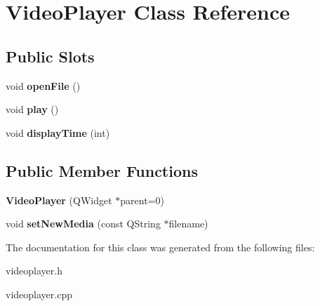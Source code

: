 \hypertarget{class_video_player}{\section{\-Video\-Player \-Class \-Reference}
\label{class_video_player}
}
\subsection*{\-Public \-Slots}
\begin{DoxyCompactItemize}
\item 
\hypertarget{class_video_player_a96b3bad4d8680ba4b41b05aeabcd26b1}{void {\bfseries open\-File} ()}\label{class_video_player_a96b3bad4d8680ba4b41b05aeabcd26b1}

\item 
\hypertarget{class_video_player_a13ba0d270e849566f33ceffd7fb425c0}{void {\bfseries play} ()}\label{class_video_player_a13ba0d270e849566f33ceffd7fb425c0}

\item 
\hypertarget{class_video_player_a7e7d8a5f78a0050b463d303a6ce0df4f}{void {\bfseries display\-Time} (int)}\label{class_video_player_a7e7d8a5f78a0050b463d303a6ce0df4f}

\end{DoxyCompactItemize}
\subsection*{\-Public \-Member \-Functions}
\begin{DoxyCompactItemize}
\item 
\hypertarget{class_video_player_a1d43337dac90ba3ec1ba178f4b1ddceb}{{\bfseries \-Video\-Player} (\-Q\-Widget $\ast$parent=0)}\label{class_video_player_a1d43337dac90ba3ec1ba178f4b1ddceb}

\item 
\hypertarget{class_video_player_a9f33fb15ac14c330e8b6fda8d9cf4164}{void {\bfseries set\-New\-Media} (const \-Q\-String $\ast$filename)}\label{class_video_player_a9f33fb15ac14c330e8b6fda8d9cf4164}

\end{DoxyCompactItemize}


\-The documentation for this class was generated from the following files\-:\begin{DoxyCompactItemize}
\item 
videoplayer.\-h\item 
videoplayer.\-cpp\end{DoxyCompactItemize}
